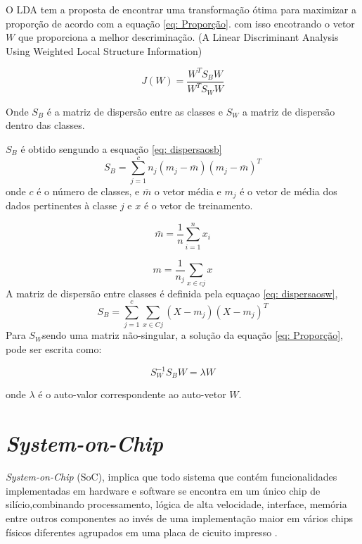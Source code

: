 O LDA tem a proposta de encontrar uma transformação ótima para maximizar a proporção de acordo com a equação \ref{eq: Proporção}.
com isso encotrando o vetor $W$ que proporciona a melhor descriminação. (A Linear Discriminant Analysis Using
Weighted Local Structure Information)

\begin{equation}
	\label{eq: Proporção}
	J(W) = \frac { W^T S_B W}{W^T S_W W}
\end{equation}

Onde $S_B$ é a matriz de dispersão entre as classes e $ S_W$ a matriz de dispersão dentro das classes. 

$S_B$ é obtido sengundo a esquação \ref{eq: dispersaosb} 
\begin{equation}
	\label{eq: dispersaosb}
	 S_B = \sum_{j=1}^{c} n_j(m_j - \bar m)(m_j -\bar m)^T 
\end{equation}
onde $c$ é o número de classes, e $\bar m$ o vetor média e  $m_j$ é o vetor de média dos dados 
pertinentes à classe $j$ e $x$ é o vetor de treinamento.

\begin{equation}
	\label{eq: media}
	\bar m = \frac{1}{n}\sum_{i=1}^{n} {x_i}
\end{equation}

\begin{equation}
	\label{eq: media2}
	m = \frac{1}{n_j}\sum_{x \in c j}^{} x
\end{equation}
A matriz de dispersão entre classes é definida pela equaçao \ref{eq: dispersaosw},
\begin{equation}
	\label{eq: dispersaosw}
	 S_B = \sum_{j=1}^{c} \sum_{x \in C j}{} (X - m_j)(X - m_j)^T 
\end{equation}
Para $S_W$sendo uma matriz não-singular, a solução da equação 
\ref{eq: Proporção}, pode ser escrita como: 

 \begin{equation}
	\label{eq: final}
	S_W^{-1} S_B W = \lambda W
\end{equation}
 
onde $\lambda$ é o auto-valor correspondente ao auto-vetor $W$.
\section{\textit{System-on-Chip}}

\textit{System-on-Chip} (SoC), implica que todo sistema que contém funcionalidades implementadas em hardware e software se encontra em um único chip de silício,combinando processamento, lógica de alta velocidade, interface, memória entre outros componentes ao invés de uma implementação maior em vários chips físicos diferentes agrupados em uma placa 
de cicuito impresso \cite{zynqBook}.

